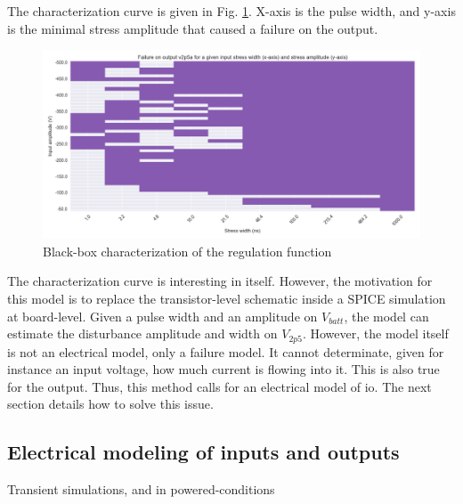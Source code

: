 
The characterization curve is given in Fig. \ref{fig:cz-black-box}.
X-axis is the pulse width, and y-axis is the minimal stress amplitude that caused a failure on the output.

\begin{figure}[!h]
  \centering
  \includegraphics[width=\textwidth]{src/4/figures/black_box_regulator.png}
  \caption{Black-box characterization of the regulation function}
  \label{fig:cz-black-box}
\end{figure}

The characterization curve is interesting in itself.
However, the motivation for this model is to replace the transistor-level schematic inside a SPICE simulation at board-level.
Given a pulse width and an amplitude on $V_{batt}$, the model can estimate the disturbance amplitude and width on $V_{2p5}$.
However, the model itself is not an electrical model, only a failure model.
It cannot determinate, given for instance an input voltage, how much current is flowing into it.
This is also true for the output.
Thus, this method calls for an electrical model of \gls{io}.
The next section details how to solve this issue.

\subsection{Electrical modeling of inputs and outputs}


Transient simulations, and in powered-conditions

